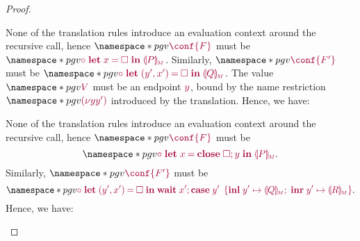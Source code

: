 \begin{proof}
\begin{case*}
\begin{subcase*}
      None of the translation rules introduce an evaluation context around the recursive call, hence $\pgv{\tm{\conf{F}}}$ must be $\pgv{\tm{\child\;\letbind{x}{\hole}{\cpgvM{P}}}}$. Similarly, $\pgv{\tm{\conf{F'}}}$ must be $\pgv{\tm{\child\;\letpair{y'}{x'}{\hole}{\cpgvM{Q}}}}$. The value $\pgv{\tm{V}}$ must be an endpoint $\tm{y}$, bound by the name restriction $\pgv{\tm{\res{y}{y'}{}}}$ introduced by the translation. Hence, we have:
      \begin{mathpar}
      \end{mathpar}
    \end{subcase*}
    \begin{subcase*}
      None of the translation rules introduce an evaluation context around the recursive call, hence $\pgv{\tm{\conf{F}}}$ must be $$\pgv{\tm{\child\;\letbind{x}{\andthen{\close\;\hole}{y}}{\cpgvM{P}}}}.$$ Similarly, $\pgv{\tm{\conf{F'}}}$ must be $$\pgv{\tm{\child\;\letpair{y'}{x'}{\hole}{\andthen{\wait\;x'}{\casesum{y'}{y'}{\cpgvM{Q}}{y'}{\cpgvM{R}}}}}}.$$ Hence, we have:
      \begin{mathpar}
\end{mathpar}
\end{subcase*}
\end{case*}
\end{proof}
